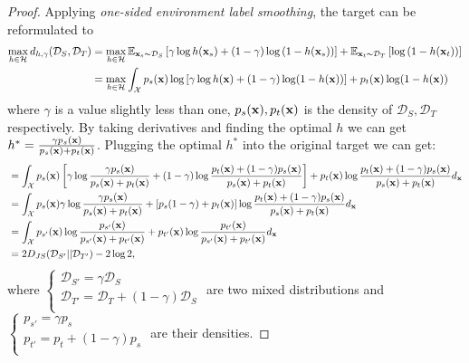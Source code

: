 \documentclass{article} \usepackage{iclr2023_conference,times}
\newcommand{\E}{\mathbb{E}}
\newcommand{\D}{\mathcal{D}}
\begin{document}
 \begin{proof}
Applying \textit{one-sided environment label smoothing}, the target can be reformulated to 
\begin{equation}
\begin{aligned}
\max_{h\in\mathcal{H}} d_{h,\gamma}(\D_S,\D_T)&=\max_{h\in\mathcal{H}} \E_{\x_s\sim \D_S}\left[\gamma\log h(\x_s)+(1-\gamma)\log\left(1-h(\x_s)\right) \right] + \E_{\x_t\sim \D_T}\left[\log\left(1-h(\x_t)\right) \right]\\
& = \max_{h\in\mathcal{H}}\int_{\mathcal{X}}p_s(\x)\log\left[\gamma\log h(\x)+(1-\gamma)\log(1-h(\x))\right]+p_t(\x)\log(1-h(\x))
\end{aligned}\end{equation}
where $\gamma$ is a value slightly less than one, $p_s(\mathbf{x}),p_t(\mathbf{x})$ is the density of $\D_S,\D_T$ respectively. By taking derivatives and finding the optimal $h$ we can get $h^*=\frac{\gamma p_s(\mathbf{x})}{p_s(\mathbf{x})+p_t(\mathbf{x})}$. Plugging the optimal $h^*$ into the original target we can get:
\begin{equation}
\begin{aligned}
&=\int_{\mathcal{X}} p_s(\x)\left[\gamma\log \frac{\gamma p_s(\x)}{p_s(\x)+p_t(\x)}+(1-\gamma)\log\frac{p_t(\x)+(1-\gamma)p_s(\x)}{p_s(\x)+p_t(\x)} \right]+p_t(\x)\log\frac{p_t(\x)+(1-\gamma)p_s(\x)}{p_s(\x)+p_t(\x)}d_{\x}\\
&=\int_{\mathcal{X}}p_s(\x)\gamma\log\frac{\gamma p_s(\x)}{p_s(\x)+p_t(\x)}+\left[p_s(1-\gamma)+p_t(\x)\right]\log\frac{p_t(\x)+(1-\gamma)p_s(\x)}{p_s(\x)+p_t(\x)}d_{\x}\\
&=\int_{\mathcal{X}}p_{s'}(\x)\log\frac{p_{s'}(\x)}{p_{s'}(\x)+p_{t'}(\x)}+p_{t'}(\x)\log\frac{p_{t'}(\x)}{p_{s'}(\x)+p_{t'}(\x)}d_{\x}\\
&=2D_{JS}(\D_{S'}||\D_{T'})-2\log2,
\end{aligned}\end{equation}
where $\left\{         \begin{array}{l} 
    \D_{S'}=\gamma\D_S\\ 
    \D_{T'}=\D_T+(1-\gamma)\D_S\\ 
  \end{array}\right.$ are two mixed distributions and $\left\{         \begin{array}{l} 
    p_{s'}=\gamma p_s\\ 
    p_{t'}=p_t+(1-\gamma)p_s\\ 
  \end{array}\right.$ are their densities. 
\end{proof}
\end{document}
